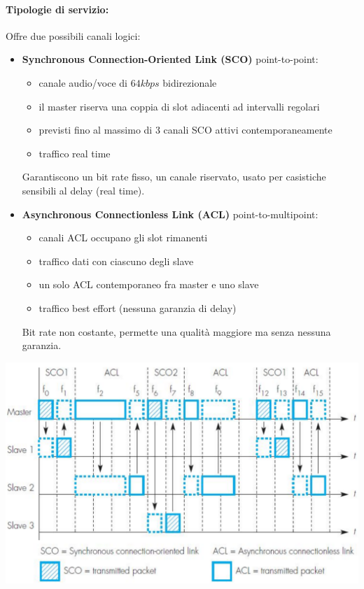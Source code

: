 \paragraph{Tipologie di servizio:} Offre due possibili canali logici: 
\begin{itemize}
	\item \textbf{Synchronous Connection-Oriented Link (SCO)} point-to-point:
	\begin{itemize}
		\item canale audio/voce di $64kbps$ bidirezionale
		\item il master riserva una coppia di slot adiacenti ad intervalli regolari
		\item previsti fino al massimo di 3 canali SCO attivi contemporaneamente
		\item traffico real time
	\end{itemize}
	Garantiscono un bit rate fisso, un canale riservato, usato per casistiche sensibili al delay (real time).
	
	\item \textbf{Asynchronous Connectionless Link (ACL)} point-to-multipoint:
	\begin{itemize}
		\item canali ACL occupano gli slot rimanenti
		\item traffico dati con ciascuno degli slave
		\item un solo ACL contemporaneo fra master e uno slave
		\item traffico best effort (nessuna garanzia di delay)
	\end{itemize}
	Bit rate non costante, permette una qualità maggiore ma senza nessuna garanzia.
\end{itemize}
\begin{center}
	\includegraphics[width=0.9\linewidth]{img/wpan/scoacl}
\end{center}

